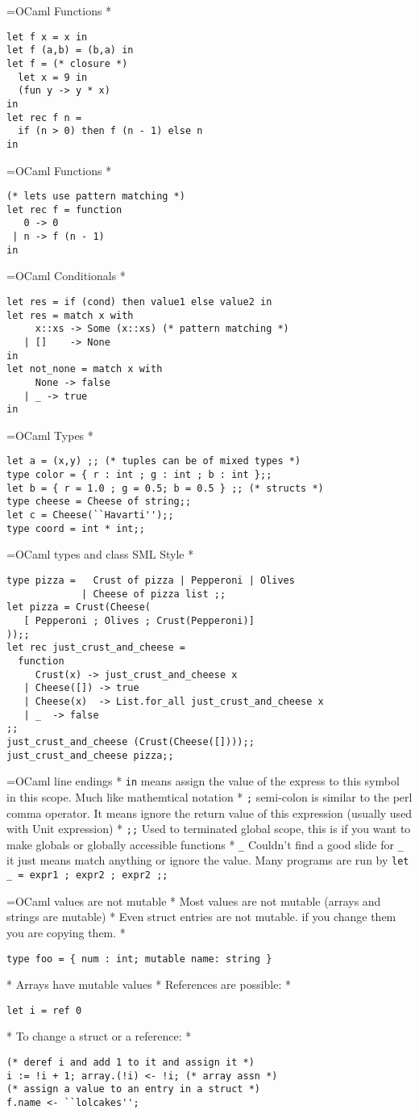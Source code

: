 \documentclass[titlepage,usenames,a4,landscape,semhelv]{seminar}
\begin{document}
\begin{slide}
=OCaml Functions
*
\begin{verbatim}
let f x = x in
let f (a,b) = (b,a) in
let f = (* closure *)
  let x = 9 in
  (fun y -> y * x)
in
let rec f n =
  if (n > 0) then f (n - 1) else n
in
\end{verbatim}
=OCaml Functions
*
\begin{verbatim}
(* lets use pattern matching *)
let rec f = function
   0 -> 0
 | n -> f (n - 1)
in

\end{verbatim}
=OCaml Conditionals
*
\begin{verbatim}
let res = if (cond) then value1 else value2 in
let res = match x with
     x::xs -> Some (x::xs) (* pattern matching *)
   | []    -> None
in
let not_none = match x with
     None -> false
   | _ -> true
in
\end{verbatim}
=OCaml Types
*
\begin{verbatim}
let a = (x,y) ;; (* tuples can be of mixed types *)
type color = { r : int ; g : int ; b : int };;
let b = { r = 1.0 ; g = 0.5; b = 0.5 } ;; (* structs *)
type cheese = Cheese of string;; 
let c = Cheese(``Havarti'');;
type coord = int * int;;
\end{verbatim}
=OCaml types and class SML Style
*
\begin{verbatim}
type pizza =   Crust of pizza | Pepperoni | Olives 
             | Cheese of pizza list ;;
let pizza = Crust(Cheese(
   [ Pepperoni ; Olives ; Crust(Pepperoni)]
));;
let rec just_crust_and_cheese = 
  function 
     Crust(x) -> just_crust_and_cheese x
   | Cheese([]) -> true
   | Cheese(x)  -> List.for_all just_crust_and_cheese x
   | _  -> false
;;
just_crust_and_cheese (Crust(Cheese([])));;
just_crust_and_cheese pizza;;
\end{verbatim}

=OCaml line endings
* \texttt{in} means assign the value of the express to this symbol in this scope. Much like mathemtical notation
* \texttt{;} semi-colon is similar to the perl comma operator. It means ignore the return value of this expression (usually used with Unit expression)
* \texttt{;;} Used to terminated global scope, this is if you want to make globals or globally accessible functions
* \texttt{\_} Couldn't find a good slide for \texttt{\_} it just means match anything or ignore the value. Many programs are run by \texttt{let \_ = expr1 ; expr2 ; expr2 ;;}

=OCaml values are not mutable
* Most values are not mutable (arrays and strings are mutable)
* Even struct entries are not mutable. if you change them you are copying them.
        * \begin{verbatim}type foo = { num : int; mutable name: string }\end{verbatim}
* Arrays have mutable values
* References are possible: 
        * \begin{verbatim}let i = ref 0\end{verbatim}
* To change a struct or a reference:
        * \begin{verbatim}
(* deref i and add 1 to it and assign it *)
i := !i + 1; array.(!i) <- !i; (* array assn *)
(* assign a value to an entry in a struct *)
f.name <- ``lolcakes'';
\end{verbatim}


\end{slide}
\end{document}
